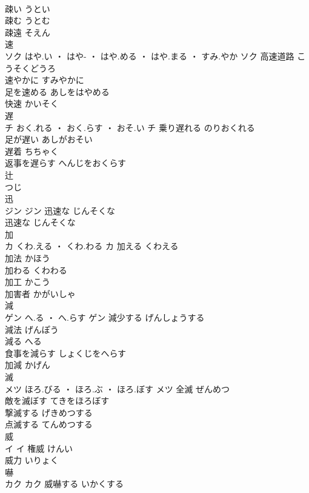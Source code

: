 \documentclass[8pt]{extreport}
\begin{document}
\begin{CJK}{UTF8}{min}
\\	疎い	うとい	
\\	疎む	うとむ	
\\	疎遠	そえん	
\\	速	
\\	ソク	はや.い ・ はや- ・ はや.める ・ はや.まる ・ すみ.やか	ソク	高速道路	こうそくどうろ	
\\	速やかに	すみやかに	
\\	足を速める	あしをはやめる	
\\	快速	かいそく	
\\	遅	
\\	チ	おく.れる ・ おく.らす ・ おそ.い	チ	乗り遅れる	のりおくれる	
\\	足が遅い	あしがおそい	
\\	遅着	ちちゃく	
\\	返事を遅らす	へんじをおくらす	
\\	辻	
\\	つじ																																				
\\	迅	
\\	ジン		ジン	迅速な	じんそくな	
\\	迅速な	じんそくな	
\\	加	
\\	カ	くわ.える ・ くわ.わる	カ	加える	くわえる	
\\	加法	かほう	
\\	加わる	くわわる	
\\	加工	かこう	
\\	加害者	かがいしゃ	
\\	減	
\\	ゲン	へ.る ・ へ.らす	ゲン	減少する	げんしょうする	
\\	減法	げんぽう	
\\	減る	へる	
\\	食事を減らす	しょくじをへらす	
\\	加減	かげん	
\\	滅	
\\	メツ	ほろ.びる ・ ほろ.ぶ ・ ほろ.ぼす	メツ	全滅	ぜんめつ	
\\	敵を滅ぼす	てきをほろぼす	
\\	撃滅する	げきめつする	
\\	点滅する	てんめつする	
\\	威	
\\	イ		イ	権威	けんい	
\\	威力	いりょく	
\\	嚇	
\\	カク		カク	威嚇する	いかくする	

\end{CJK}
\end{document}
